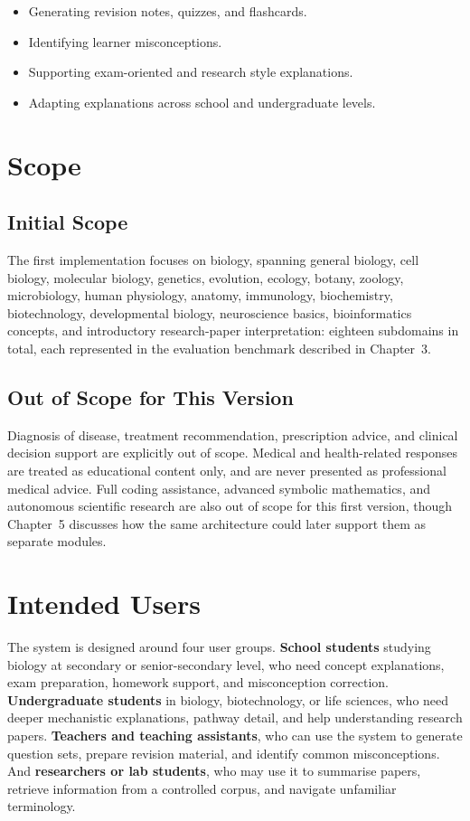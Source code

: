 \begin{itemize}
\item Generating revision notes, quizzes, and flashcards.
\item Identifying learner misconceptions.
\item Supporting exam-oriented and research style explanations.
\item Adapting explanations across school and undergraduate levels.
\end{itemize}

\section{Scope}\label{1.5}

\subsection{Initial Scope}\label{1.5.1}

The first implementation focuses on biology, spanning general biology, cell
biology, molecular biology, genetics, evolution, ecology, botany, zoology,
microbiology, human physiology, anatomy, immunology, biochemistry,
biotechnology, developmental biology, neuroscience basics, bioinformatics
concepts, and introductory research-paper interpretation: eighteen
subdomains in total, each represented in the evaluation benchmark described
in Chapter~3.

\subsection{Out of Scope for This Version}\label{1.5.2}

Diagnosis of disease, treatment recommendation, prescription advice, and
clinical decision support are explicitly out of scope. Medical and
health-related responses are treated as educational content only, and are
never presented as professional medical advice. Full coding assistance,
advanced symbolic mathematics, and autonomous scientific research are also
out of scope for this first version, though Chapter~5 discusses how the
same architecture could later support them as separate modules.

\section{Intended Users}\label{1.6}

The system is designed around four user groups. \textbf{School students}
studying biology at secondary or senior-secondary level, who need concept
explanations, exam preparation, homework support, and misconception
correction. \textbf{Undergraduate students} in biology, biotechnology, or
life sciences, who need deeper mechanistic explanations, pathway detail,
and help understanding research papers. \textbf{Teachers and teaching
assistants}, who can use the system to generate question sets, prepare
revision material, and identify common misconceptions. And
\textbf{researchers or lab students}, who may use it to summarise papers,
retrieve information from a controlled corpus, and navigate unfamiliar
terminology.

